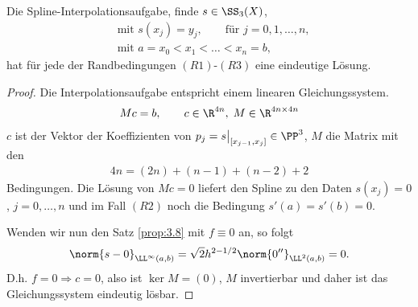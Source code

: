 \begin{prop}
\label{prop:3.9}
Die Spline-Interpolationsaufgabe, finde $s\in\SS_3(X)$,
\begin{align*}
&\text{mit }s(x_j)=y_j,\qquad \text{für }j=0,1,\ldots,n,\\
&\text{mit }a=x_0<x_1<\ldots<x_n=b,
\end{align*}
hat für jede der Randbedingungen $(R1)$-$(R3)$
eine eindeutige Lösung.\fishhere
\end{prop}
\begin{proof}
Die Interpolationsaufgabe entspricht einem linearen Gleichungssystem.
\begin{align*}
Mc = b,\qquad c\in\R^{4n},\; M\in\R^{4n\times 4n}
\end{align*}
$c$ ist der Vektor der Koeffizienten von $p_j = s\big|_{[x_{j-1},x_j]}
\in\PP^3$, $M$ die Matrix mit den
\begin{align*}
4n = (2n) +(n-1)+(n-2) + 2
\end{align*}
Bedingungen. Die Lösung von $Mc = 0$ liefert den Spline zu den Daten
$s(x_j)=0$, $j=0,\ldots,n$ und im Fall $(R2)$ noch die Bedingung $s'(a) = s'(b)
= 0$.

Wenden wir nun den Satz \ref{prop:3.8} mit $f\equiv 0$ an, so folgt
\begin{align*}
\norm{s-0}_{\LL^\infty(a,b)} = \sqrt{2}h^{2-1/2}\norm{0''}_{\LL^2(a,b)} = 0.
\end{align*}
D.h. $f=0 \Rightarrow c=0$, also ist $\ker M = (0)$, $M$ invertierbar und daher
ist das Gleichungssystem eindeutig lösbar.\qedhere
\end{proof}